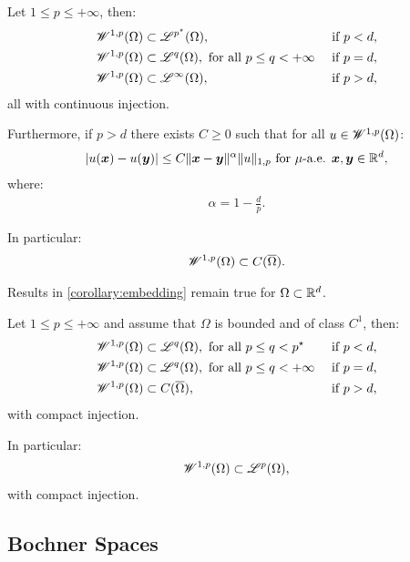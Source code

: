 \begin{corollary}
    Let $1 \leq p \leq +\infty$, then:
    \begin{align}
        & \mathscr{W}^{1, p}(\Omega) \subset \mathscr{L}^{p^{\star}}(\Omega), & \text{ if } p < d, \\
        & \mathscr{W}^{1, p}(\Omega) \subset \mathscr{L}^{q}(\Omega), \text{ for all } p \leq q < +\infty & \text{ if } p = d, \\
        & \mathscr{W}^{1, p}(\Omega) \subset \mathscr{L}^{\infty}(\Omega), & \text{ if } p > d,
    \end{align}
    all with continuous injection.

    Furthermore, if $p > d$ there exists $C \geq 0$ such that for all $u \in \mathscr{W}^{1, p}(\Omega)$:
    \begin{gather}
        \lvert u(\bm{x}) - u(\bm{y}) \rvert \leq C \lVert \bm{x} - \bm{y} \rVert^{\alpha} \lVert u \rVert_{1, p} \text{ for } \mu \text{-a.e. } \bm{x}, \bm{y} \in \mathbb{R}^{d},
    \end{gather}
    where:
    \begin{gather}
        \alpha = 1 - \frac{d}{p}.
    \end{gather}

    In particular:
    \begin{gather}
        \mathscr{W}^{1, p}(\Omega) \subset C(\overline{\Omega}).
    \end{gather}
\end{corollary}

\begin{corollary}
    Results in \ref{corollary:embedding} remain true for $\Omega \subset \mathbb{R}^{d}$.
\end{corollary}

\begin{theorem}
    Let $1 \leq p \leq +\infty$ and assume that $\Omega$ is bounded and of class $C^1$, then:
    \begin{align}
        & \mathscr{W}^{1, p}(\Omega) \subset \mathscr{L}^{q}(\Omega), \text{ for all } p \leq q < p^{\star} & \text{ if } p < d, \\
        & \mathscr{W}^{1, p}(\Omega) \subset \mathscr{L}^{q}(\Omega), \text{ for all } p \leq q < +\infty & \text{ if } p = d, \\
        & \mathscr{W}^{1, p}(\Omega) \subset C(\overline{\Omega}), & \text{ if } p > d,
    \end{align}
    with compact injection.

    In particular:
    \begin{gather}
        \mathscr{W}^{1, p}(\Omega) \subset \mathscr{L}^{p}(\Omega),
    \end{gather}
    with compact injection.
\end{theorem}

\newpage
\subsection{Bochner Spaces}

